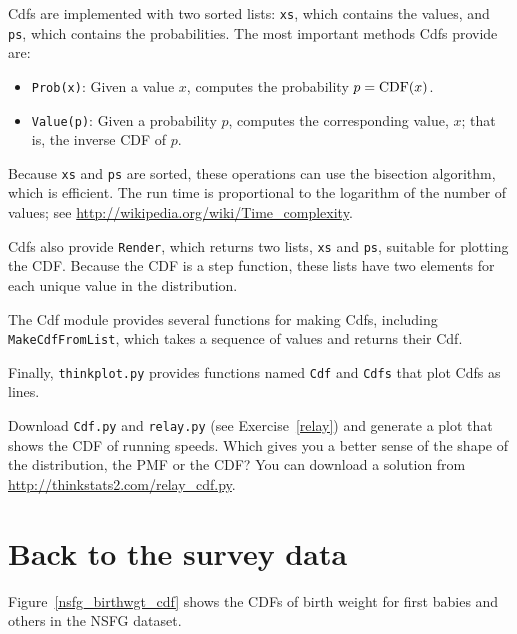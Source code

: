 \documentclass[12pt]{book}
\begin{document}
Cdfs are implemented with two sorted lists: {\tt xs}, which contains
the values, and {\tt ps}, which contains the probabilities.  The
most important methods Cdfs provide are:

\begin{itemize}

\item {\tt Prob(x)}: Given a value $x$, computes the probability $p = \mathrm{CDF}(x)$.

\item {\tt Value(p)}: Given a probability $p$, computes the
corresponding value, $x$; that is, the inverse CDF of $p$.

\end{itemize}

Because {\tt xs} and {\tt ps} are sorted, these operations can use the
bisection algorithm, which is efficient.  The run time is proportional
to the logarithm of the number of values; see
\url{http://wikipedia.org/wiki/Time_complexity}.

Cdfs also provide {\tt Render}, which returns two lists, {\tt xs} and
{\tt ps}, suitable for plotting the CDF.  Because the CDF is a
step function, these lists have two elements for each unique
value in the distribution.

The Cdf module provides several functions for making Cdfs, including
{\tt MakeCdfFromList}, which takes a sequence of values
and returns their Cdf.

Finally, {\tt thinkplot.py} provides functions named {\tt Cdf} and
{\tt Cdfs} that plot Cdfs as lines.

\begin{exercise}
Download {\tt Cdf.py} and \verb"relay.py" (see
Exercise~\ref{relay}) and generate a plot that shows the CDF of
running speeds.  Which gives you a better sense of the shape of the
distribution, the PMF or the CDF?  You can download a solution
from \url{http://thinkstats2.com/relay_cdf.py}.

\end{exercise}


\section{Back to the survey data}
\label{birth_weights}

Figure~\ref{nsfg_birthwgt_cdf} shows the CDFs of birth weight for
first babies and others in the NSFG dataset.
\end{document}
